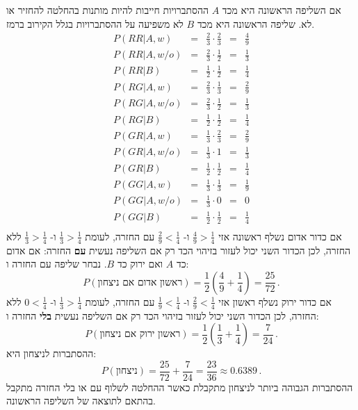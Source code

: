 אם השליפה הראשונה היא מכד
$A$
ההסתברויות חייבות להיות מותנות בהחלטה להחזיר או לא. שליפה הראשונה היא מכד
$B$
לא משפיעה על ההסתברויות בגלל הקירוב ברמז.
\[
\renewcommand*{\arraystretch}{1.5}
\begin{array}{lcccc}
P(RR|A,w) &=& \frac{2}{3} \cdot \frac{2}{3} &=& \frac{4}{9}\\
P(RR|A,w/o) &=& \frac{2}{3} \cdot \frac{1}{2} &=& \frac{1}{3}\\
P(RR|B) &=& \frac{1}{2} \cdot \frac{1}{2} &=& \frac{1}{4}\\
\hline
P(RG|A,w) &=& \frac{2}{3} \cdot \frac{1}{3} &=& \frac{2}{9}\\
P(RG|A,w/o) &=& \frac{2}{3} \cdot \frac{1}{2} &=& \frac{1}{3}\\
P(RG|B) &=& \frac{1}{2} \cdot \frac{1}{2} &=& \frac{1}{4}\\
\hline
P(GR|A,w) &=& \frac{1}{3} \cdot \frac{2}{3} &=& \frac{2}{9}\\
P(GR|A,w/o) &=& \frac{1}{3} \cdot 1 &=& \frac{1}{3}\\
P(GR|B) &=& \frac{1}{2} \cdot \frac{1}{2} &=& \frac{1}{4}\\
\hline
P(GG|A,w) &=& \frac{1}{3} \cdot \frac{1}{3} &=& \frac{1}{9}\\
P(GG|A,w/o) &=& \frac{1}{3} \cdot 0 &=&0\\
P(GG|B) &=& \frac{1}{2} \cdot \frac{1}{2} &=& \frac{1}{4}\\\end{array}
\]
אם כדור אדום נשלף ראשונה אזי 
$\frac{4}{9}>\frac{1}{4}$
ו-%
$\frac{2}{9}<\frac{1}{4}$
עם החזרה, לעומת
$\frac{1}{3}>\frac{1}{4}$
ו-%
$\frac{1}{3}>\frac{1}{4}$
ללא החזרה, לכן הכדור השני יכול לעזור בזיהוי הכד רק אם השליפה נעשית 
\textbf{עם}
החזרה: אם אדום כד
$A$
ואם ירוק כד
$B$.
נבחר שליפה עם החזרה ו:
\[
P(\textrm{ראשון אדום אם ניצחון})=\frac{1}{2}\left(\frac{4}{9}+\frac{1}{4}\right)=\frac{25}{72}\,.
\]
אם כדור ירוק נשלף ראשון אזי
$\frac{2}{9}<\frac{1}{4}$
ו-%
$\frac{1}{9}<\frac{1}{4}$
עם החזרה, לעומת
$\frac{1}{3}>\frac{1}{4}$
ו-%
$0<\frac{1}{4}$
ללא החזרה, לכן הכדור השני יכול לעזור בזיהוי הכד רק אם השליפה נעשית 
\textbf{בלי}
החזרה ו:
\[
P(\textrm{ראשון ירוק אם ניצחון})=\frac{1}{2}\left(\frac{1}{3}+\frac{1}{4}\right)=\frac{7}{24}\,.
\]
ההסתברות לניצחון היא:
\[
P(\textrm{ניצחון})=\frac{25}{72} + \frac{7}{24}=\frac{23}{36}\approx 0.6389\,.
\]
ההסתברות הגבוהה ביותר לניצחון מתקבלת כאשר ההחלטה לשלוף עם או בלי החזרה מתקבל בהתאם לתוצאה של השליפה הראשונה.

